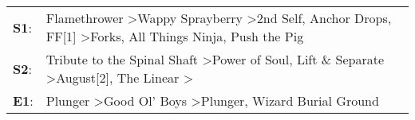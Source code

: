 \begin{supertabular}{p{0.03\textwidth}p{0.92\textwidth}}
 \textbf{S1}:  &  Flamethrower\textsuperscript{} \textgreater \enspace Wappy Sprayberry\textsuperscript{} \textgreater \enspace 2nd Self\textsuperscript{}, \enspace Anchor Drops\textsuperscript{}, \enspace FF[1]\textsuperscript{} \textgreater \enspace Forks\textsuperscript{}, \enspace All Things Ninja\textsuperscript{}, \enspace Push the Pig\textsuperscript{}  \enspace  \\
 \textbf{S2}:  &                                                                   Tribute to the Spinal Shaft\textsuperscript{} \textgreater \enspace Power of Soul\textsuperscript{}, \enspace Lift \& Separate\textsuperscript{} \textgreater \enspace August[2]\textsuperscript{}, \enspace The Linear\textsuperscript{} \textgreater {}\textsuperscript{}  \enspace  \\
 \textbf{E1}:  &                                                                                                                                                                         Plunger\textsuperscript{} \textgreater \enspace Good Ol' Boys\textsuperscript{} \textgreater \enspace Plunger\textsuperscript{}, \enspace Wizard Burial Ground\textsuperscript{}  \enspace  \\
\end{supertabular}

